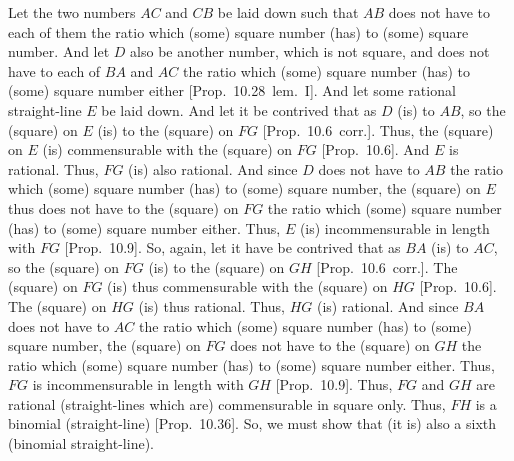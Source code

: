 \begin{Parallel}{}{}
{Let the two numbers $AC$ and $CB$ be laid down such that $AB$ does
not have to each of them the ratio which (some) square number (has) to (some) square number.  And let $D$  also be another number, which is not
square, and does not have to each of $BA$ and $AC$ the ratio which (some)
square number (has) to (some) square number either [Prop.~10.28~lem.~I]. And let some rational straight-line $E$ be laid down. And let it be contrived that as $D$ (is) to
$AB$, so the (square) on $E$ (is) to the (square) on $FG$ [Prop.~10.6~corr.].  Thus, the (square) on $E$
(is) commensurable with the (square) on $FG$ [Prop.~10.6]. And $E$ is rational. Thus, $FG$
(is) also rational.  And since $D$ does not have to $AB$ the ratio
which (some) square number (has) to (some) square number, the (square) on $E$ thus does not have to the (square) on $FG$ the ratio which (some) square number (has) to (some) square number either. Thus, $E$ (is) incommensurable in length with $FG$ [Prop.~10.9].
So, again, let it have be contrived that as $BA$ (is) to $AC$, so the (square)
on $FG$ (is) to the (square) on $GH$ [Prop.~10.6~corr.]. The (square) on $FG$ (is)
thus commensurable with the (square) on $HG$ [Prop.~10.6].
 The (square) on $HG$ (is) thus rational.  Thus, $HG$ (is) rational. And since $BA$ does not have to
$AC$ the ratio which (some) square number (has) to (some) square number,
the (square) on $FG$ does not have to the (square) on $GH$ the
ratio which (some) square number (has) to (some) square number either.
Thus, $FG$ is incommensurable in length with $GH$ [Prop.~10.9]. Thus, $FG$ and $GH$ are rational (straight-lines which are) commensurable in square only. Thus, $FH$
is a binomial (straight-line) [Prop.~10.36]. So,
we must show that (it is) also a sixth (binomial straight-line).

}
\end{Parallel}
